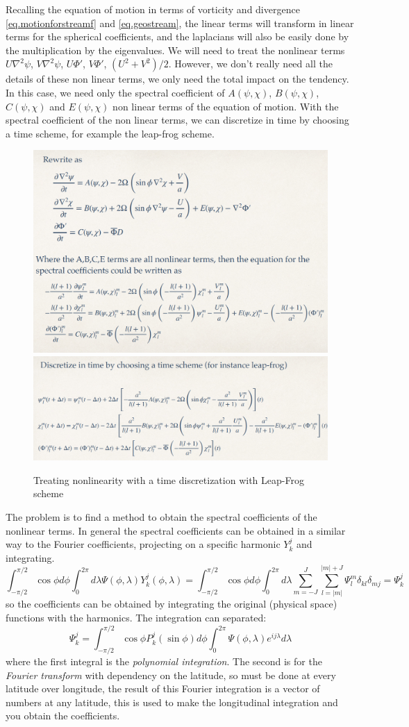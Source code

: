 Recalling the equation of motion in terms of vorticity and divergence \ref{eq.motionforstreamf} and \ref{eq.geostream}, the linear terms will transform in linear terms for the spherical coefficients, and the laplacians will also be easily done by the multiplication by the eigenvalues. We will need to treat the nonlinear terms $U\nabla^2\psi$, $V\nabla^2\psi$, $U\Phi'$, $V\Phi'$, $(U^2+V^2)/2$.  However, we don't really need all the details of these non linear terms, we only need the total impact on the tendency. In this case, we need only the spectral coefficient of $A(\psi,\chi)$, $B(\psi,\chi)$, $C(\psi,\chi)$ and $E(\psi,\chi)$ non linear terms of the equation of motion. With the spectral coefficient of the non linear terms, we can discretize in time by choosing a time scheme, for example the leap-frog scheme.
\begin{figure}[htpb]
	\centering
	\includegraphics[width=0.5\linewidth]{uploads/Screenshot 2024-11-18 095232.png}\quad\includegraphics[width=0.5\linewidth]{uploads/Screenshot 2024-11-18 095428.png}
	\caption{Treating nonlinearity with a time discretization with Leap-Frog scheme}
	\label{fig:trating nonlinearity}
\end{figure}

The problem is to find a method to obtain the spectral coefficients of the nonlinear terms. In general the spectral coefficients can be obtained in a similar way to the
Fourier coefficients, projecting on a specific harmonic $Y_k^j$ and integrating.
\[\int_{-\pi/2}^{\pi/2}\cos\phi d\phi\int_0^{2\pi}d\lambda\Psi(\phi,\lambda) Y_k^j(\phi,\lambda)=\int_{-\pi/2}^{\pi/2}\cos\phi d\phi\int_0^{2\pi}d\lambda\displaystyle\sum_{m=-J}^J\displaystyle\sum_{l=|m|}^{|m|+J}\Psi_l^m\delta_{kl}\delta_{mj}=\Psi_k^j\]
so the coefficients can be obtained by integrating the original (physical space) functions with the harmonics. The integration can separated:
\begin{equation}
	\Psi_k^j=\int_{-\pi/2}^{\pi/2}\cos\phi P_k^j(\sin\phi)d\phi\int_0^{2\pi}\Psi(\phi, \lambda)e^{ij\lambda}d\lambda
\end{equation}
where the first integral is the \textit{polynomial integration}. The second is for the \textit{Fourier transform} with dependency on the latitude, so must be done at every latitude over longitude, the result of this Fourier integration is a vector of numbers at any latitude, this is used to make the longitudinal integration and you obtain the coefficients.

